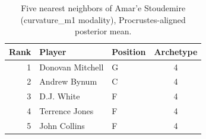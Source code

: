 \begin{table}[htbp]
  \centering\small
  \begin{tabular}{rllc}
    \toprule
    Rank & Player & Position & Archetype \\
    \midrule
    1 & Donovan Mitchell & G & 4 \\
    2 & Andrew Bynum & C & 4 \\
    3 & D.J. White & F & 4 \\
    4 & Terrence Jones & F & 4 \\
    5 & John Collins & F & 4 \\
    \bottomrule
  \end{tabular}
  \caption{Five nearest neighbors of Amar'e Stoudemire (curvature_m1 modality), Procrustes-aligned posterior mean.}
  \label{tab:Amar_e_Stoudemire_neighbors_curvature_m1}
\end{table}

